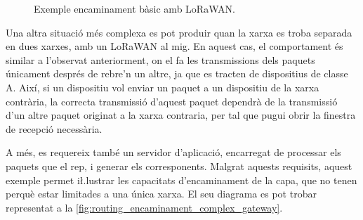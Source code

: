 \documentclass{tfgitic}[2024/07/01]
\begin{document}
{\begin{figure}[h]
    \caption{Exemple encaminament bàsic amb  LoRaWAN.}
    \label{fig:routing_encaminament_basic_gateway}
\end{figure}

Una altra situació més complexa es pot produir quan la xarxa es troba separada en dues xarxes, amb un  LoRaWAN al mig. En aquest cas, el comportament és similar a l'observat anteriorment, on el  fa les transmissions dels paquets únicament després de rebre'n un altre, ja que es tracten de dispositius de classe A. Així, si un dispositiu vol enviar un paquet a un dispositiu de la xarxa contrària, la correcta transmissió d'aquest paquet dependrà de la transmissió d'un altre paquet originat a la xarxa contraria, per tal que pugui obrir la finestra de recepció necessària.

A més, es requereix també un servidor d'aplicació, encarregat de processar els paquets que el  rep, i generar els  corresponents. Malgrat aquests requisits, aquest exemple permet i\l.lustrar les capacitats d'encaminament de la capa, que no tenen perquè estar limitades a una única xarxa. El seu diagrama es pot trobar representat a la \autoref{fig:routing_encaminament_complex_gateway}.

\begin{figure}[h]
    \centering
    \begin{tikzpicture}[
        device/.style={draw=none, minimum width=1cm, minimum height=0.8cm},
        msg/.style={-Stealth, thick},
        wan/.style={-Stealth, thick, dashed},
        timeout/.style={red, thick, dashed},
        node distance=1cm and 3cm,
        timeline/.style={draw, dashed, white},
        fail/.style={thick, cross at end}
    ]
    

\end{tikzpicture}
\end{figure}}
\end{document}
